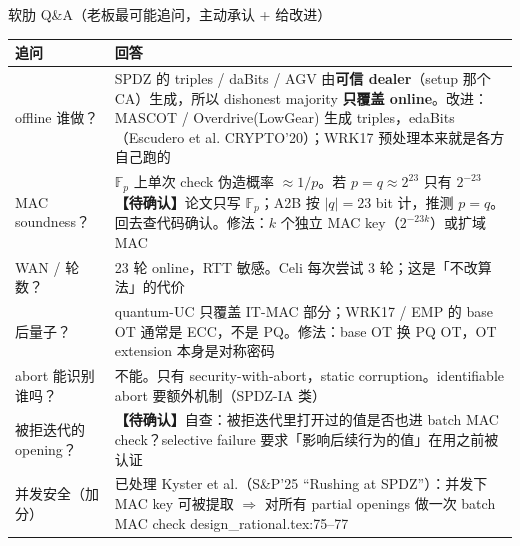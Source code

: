\documentclass[aspectratio=169,10pt,fontset=none]{ctexbeamer}
\newcommand{\warn}[1]{{\color{warn}\textbf{【待确认】}#1}}
\newcommand{\src}[1]{{\scriptsize\color{gray}#1}}
\begin{document}
\begin{frame}{软肋 Q\&A（老板最可能追问，主动承认 + 给改进）}
\renewcommand{\arraystretch}{1.2}
\begin{tabularx}{\textwidth}{@{}p{3.4cm}Y@{}}
\toprule
\textbf{追问} & \textbf{回答} \\\midrule
offline 谁做？ & SPDZ 的 triples / daBits / AGV 由\textbf{可信 dealer}（setup 那个 CA）生成，所以 dishonest majority \textbf{只覆盖 online}。改进：MASCOT / Overdrive(LowGear) 生成 triples，edaBits（Escudero et al. CRYPTO'20）；WRK17 预处理本来就是各方自己跑的 \\
MAC soundness？ & $\mathbb F_p$ 上单次 check 伪造概率 $\approx 1/p$。若 $p=q\approx2^{23}$ 只有 $2^{-23}$ \warn{论文只写 $\mathbb F_p$；A2B 按 $|q|=23$ bit 计，推测 $p=q$。回去查代码确认}。修法：$k$ 个独立 MAC key（$2^{-23k}$）或扩域 MAC \\
WAN / 轮数？ & 23 轮 online，RTT 敏感。Celi 每次尝试 3 轮；这是「不改算法」的代价 \\
后量子？ & quantum-UC 只覆盖 IT-MAC 部分；WRK17 / EMP 的 base OT 通常是 ECC，不是 PQ。修法：base OT 换 PQ OT，OT extension 本身是对称密码 \\
abort 能识别谁吗？ & 不能。只有 security-with-abort，static corruption。identifiable abort 要额外机制（SPDZ-IA 类） \\
被拒迭代的 opening？ & \warn{自查：被拒迭代里打开过的值是否也进 batch MAC check？selective failure 要求「影响后续行为的值」在用之前被认证} \\
并发安全（加分）& 已处理 Kyster et al.（S\&P'25 ``Rushing at SPDZ''）：并发下 MAC key 可被提取 $\Rightarrow$ 对所有 partial openings 做一次 batch MAC check \src{design\_rational.tex:75--77} \\
\bottomrule
\end{tabularx}
\end{frame}
\end{document}
